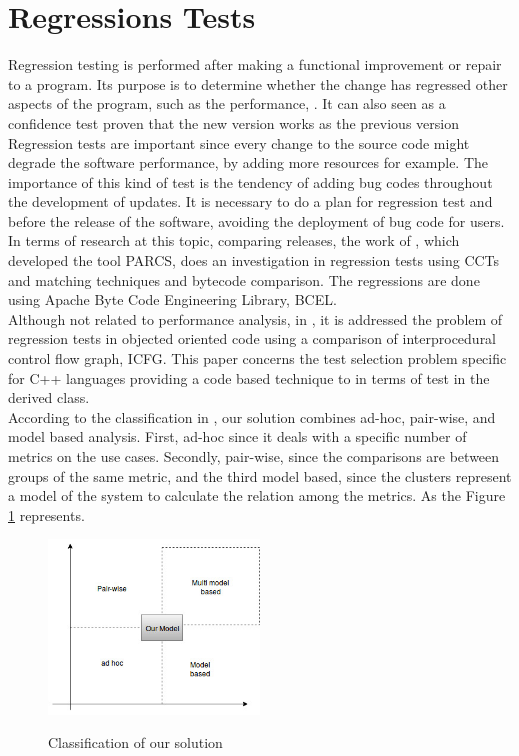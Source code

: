 \section{Regressions Tests}
Regression testing is performed after making a functional improvement or repair to a program. Its purpose is to determine whether the change has regressed other aspects of the program, such as the performance, \cite{book_testing}. It can also seen as a confidence test proven that the new version works as the previous version\\Regression tests are important since every change to the source code might degrade the software
performance, by adding more resources for example\cite{industrial}.
The importance of this kind of test is the tendency of adding bug codes throughout the development of updates. It is necessary to do a plan for regression test and before the release of the software, avoiding the deployment of bug code for users.\\
In terms of research at this topic, comparing releases, the work of \cite{parcs}, which developed the tool PARCS, does an investigation in regression tests using CCTs and matching techniques and bytecode comparison.
The regressions are done using Apache Byte Code Engineering Library, BCEL. \\

Although not related to performance analysis, in \cite{book_testing}, it is addressed the problem of regression tests in objected oriented code using a comparison of interprocedural control flow graph, ICFG. This paper concerns the test selection problem specific for C++ languages providing a code based technique to in terms of test in the derived class.\\

According to the classification in \cite{cluster}, our solution combines ad-hoc, pair-wise, and model based analysis. First, ad-hoc since it deals with a specific number of metrics on the use cases. Secondly, pair-wise, since the comparisons are between groups of the same metric, and the third model based, since the clusters represent a model of the system to calculate the relation among the metrics. As the Figure \ref{fig:cluster_model} represents.

\begin{figure}[h]
          \center
          \caption{Classification of our solution}
            \includegraphics[width=0.50\textwidth]{figures/cluster_model.jpg}
            \label{fig:cluster_model}
\end{figure}

